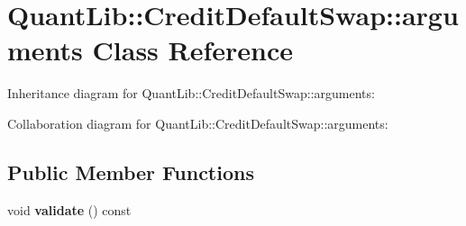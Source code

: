 \section{Quant\+Lib\+:\+:Credit\+Default\+Swap\+:\+:arguments Class Reference}
\label{class_quant_lib_1_1_credit_default_swap_1_1arguments}


Inheritance diagram for Quant\+Lib\+:\+:Credit\+Default\+Swap\+:\+:arguments\+:


Collaboration diagram for Quant\+Lib\+:\+:Credit\+Default\+Swap\+:\+:arguments\+:
\subsection*{Public Member Functions}
\begin{DoxyCompactItemize}
\item 
void {\bfseries validate} () const \label{class_quant_lib_1_1_credit_default_swap_1_1arguments_a1e098574445678ee0025ea0ea510a3bb}

\end{DoxyCompactItemize}
